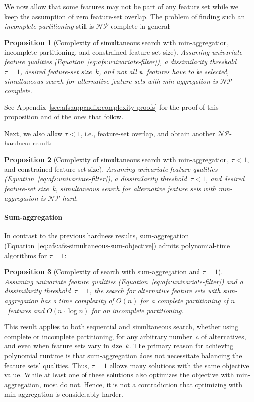 \documentclass[iicol, sn-basic, Numbered]{sn-jnl} %
\theoremstyle{plain}
\newtheorem{proposition}{Proposition}
\theoremstyle{definition}
\begin{document}
We now allow that some features may not be part of any feature set while we keep the assumption of zero feature-set overlap.
The problem of finding such an \emph{incomplete partitioning} still is $\mathcal{NP}$-complete in general:
%
\begin{proposition}[Complexity of simultaneous search with min-aggregation, incomplete partitioning, and constrained feature-set size]
	Assuming univariate feature qualities (Equation~\ref{eq:afs:univariate-filter}), a dissimilarity threshold~$\tau = 1$, desired feature-set size~$k$, and \emph{not} all $n$~features have to be selected, simultaneous search for alternative feature sets with min-aggregation is $\mathcal{NP}$-complete.
	\label{prop:afs:complexity-incomplete-partitioning-min-constrained-k}
\end{proposition}
%
See Appendix~\ref{sec:afs:appendix:complexity-proofs} for the proof of this proposition and of the ones that follow. 

Next, we also allow $\tau < 1$, i.e., feature-set overlap, and obtain another $\mathcal{NP}$-hardness result:
%
\begin{proposition}[Complexity of simultaneous search with min-aggregation, $\tau < 1$, and constrained feature-set size]
	Assuming univariate feature qualities (Equation~\ref{eq:afs:univariate-filter}), a dissimilarity threshold~$\tau < 1$, and desired feature-set size~$k$, simultaneous search for alternative feature sets with min-aggregation is $\mathcal{NP}$-hard.
	\label{prop:afs:complexity-no-partitioning-min-constrained-k}
\end{proposition}

\paragraph{Sum-aggregation}

In contrast to the previous hardness results, sum-aggregation (Equation~\ref{eq:afs:afs-simultaneous-sum-objective}) admits polynomial-time algorithms for $\tau=1$:
%
\begin{proposition}[Complexity of search with sum-aggregation and $\tau=1$]
	Assuming univariate feature qualities (Equation~\ref{eq:afs:univariate-filter}) and a dissimilarity threshold~$\tau = 1$, the search for alternative feature sets with sum-aggregation has a time complexity of $O(n)$ for a complete partitioning of $n$~features and $O(n \cdot \log n)$ for an incomplete partitioning.
	\label{prop:afs:complexity-partitioning-sum}
\end{proposition}
%
This result applies to both sequential and simultaneous search, whether using complete or incomplete partitioning, for any arbitrary number~$a$ of alternatives, and even when feature sets vary in size~$k$.
The primary reason for achieving polynomial runtime is that sum-aggregation does not necessitate balancing the feature sets' qualities. 
Thus, $\tau=1$ allows many solutions with the same objective value.
While at least one of these solutions also optimizes the objective with min-aggregation, most do not.
Hence, it is not a contradiction that optimizing with min-aggregation is considerably harder.
\end{document}
